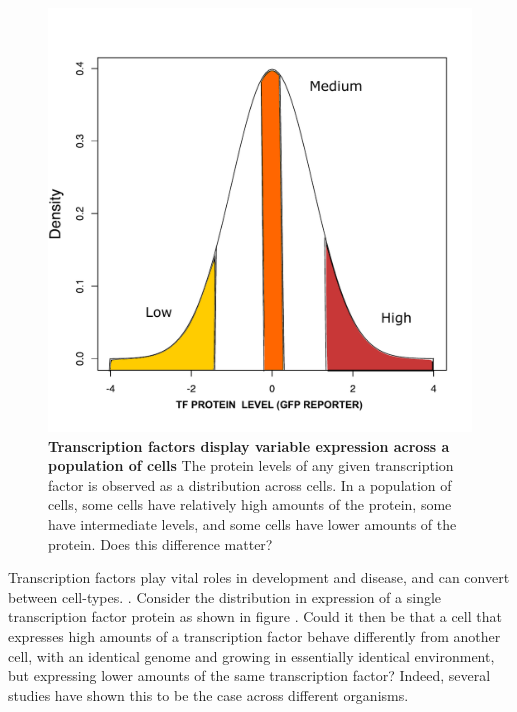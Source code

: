 \begin{figure}[t!]  
    \centering
    \includegraphics[width=\linewidth, scale=0.25]{figures/intro/intro_gfp_density_X.pdf}
    \caption[Transcription factors display variable expression across a population of cells]{%
        \textbf{Transcription factors display variable expression across a population of cells}
        The protein levels of any given transcription factor is observed as a distribution across cells. In a population of cells, some cells have relatively high amounts of the protein, some have intermediate levels, and some cells have lower amounts of the protein. Does this difference matter?
    }
    \label{fig:intro2}
\end{figure}

Transcription factors play vital roles in development and disease, and can convert between cell-types. \cite{weirauch2011ahotf} \cite{levine2003n}. Consider the distribution in expression of a single transcription factor protein as shown in figure . Could it then be that a cell that expresses high amounts of a transcription factor behave differently from another cell, with an identical genome and growing in essentially identical environment, but expressing lower amounts of the same transcription factor? Indeed, several studies have shown this to be the case across different organisms.

